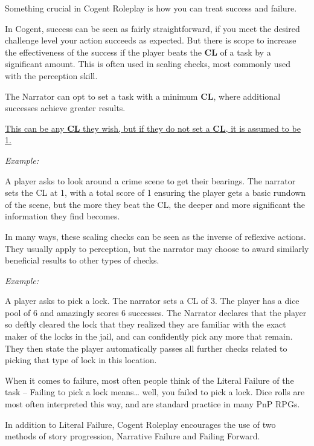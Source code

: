 Something crucial in Cogent Roleplay is how you can treat success and failure.

In Cogent, success can be seen as fairly straightforward, if you meet the desired challenge level your action succeeds as expected. But there is scope to increase the effectiveness of the success if the player beats the \textbf{CL} of a task by a significant amount. This is often used in scaling checks, most commonly used with the perception skill.

The Narrator can opt to set a task with a minimum \textbf{CL}, where additional successes achieve greater results. 

\begin{center}
    \underline{This can be any \textbf{CL} they wish, but if they do not set a \textbf{CL}, it is assumed to be 1.}
\end{center}

\textit{Example:}
\begin{displayquote}
    A player asks to look around a crime scene to get their bearings. The narrator sets the CL at 1, with a total score of 1 ensuring the player gets a basic rundown of the scene, but the more they beat the CL, the deeper and more significant the information they find becomes.
\end{displayquote}

In many ways, these scaling checks can be seen as the inverse of reflexive actions. They usually apply to perception, but the narrator may choose to award similarly beneficial results to other types of checks.

\textit{Example:}
\begin{displayquote}
    A player asks to pick a lock. The narrator sets a CL of 3. The player has a dice pool of 6 and amazingly scores 6 successes. The Narrator declares that the player so deftly cleared the lock that they realized they are familiar with the exact maker of the locks in the jail, and can confidently pick any more that remain. They then state the player automatically passes all further checks related to picking that type of lock in this location.
\end{displayquote}

When it comes to failure, most often people think of the Literal Failure of the task – Failing to pick a lock means… well, you failed to pick a lock. Dice rolls are most often interpreted this way, and are standard practice in many PnP RPGs.

In addition to Literal Failure, Cogent Roleplay encourages the use of two methods of story progression, Narrative Failure and Failing Forward.

